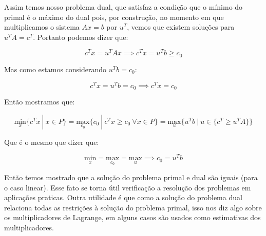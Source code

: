 Assim temos nosso problema dual, que satisfaz a condição que o mínimo do primal é o máximo do
dual pois, por construção, no momento em que multiplicamos o sistema \(Ax = b\) por \(u^T\),
vemos que existem soluções para \(u^TA = c^T\). Portanto podemos dizer que:

\begin{equation}
  c^Tx = u^TAx \implies c^Tx = u^Tb \geq c_0
\end{equation}

Mas como estamos considerando \(u^Tb = c_0\):

\begin{equation}
 c^Tx = u^Tb = c_0 \implies c^Tx = c_0
\end{equation}


Então mostramos que:

\begin{equation}
\underset{x}{\mathrm{min}}\{c^Tx\ |\ x \in P \}
=
\underset{c_0}{\mathrm{max}}\{c_0\ |\ c^Tx \geq c_0\ \forall x \in P\}
=
\underset{u}{\mathrm{max}}\{u^Tb\ |\ u \in \{c^T \geq u^TA \} \}
\end{equation}

Que é o mesmo que dizer que:

\begin{equation}
\underset{x}{\mathrm{min}} = \underset{c_0}{\mathrm{max}} = \underset{u}{\mathrm{max}} \implies c_0 = u^Tb
\end{equation}

Então temos mostrado que a solução do problema primal e dual são iguais (para o caso linear). Esse fato se
torna útil verificação a resolução dos problemas em aplicações praticas. Outra utilidade é que como a
solução do problema dual relaciona todas as restrições à solução do problema primal, isso nos diz algo
sobre os multiplicadores de Lagrange, em alguns casos são usados como estimativas dos multiplicadores.